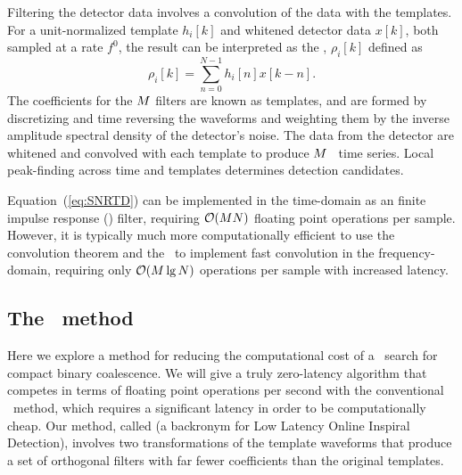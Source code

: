 Filtering the detector data involves a convolution of the data with the
templates.  For a unit-normalized template $h_i[k]$ and whitened detector data
$x[k]$, both sampled at a rate $f^0$, the result can be interpreted as the
\SNR{}, $\rho_i[k]$ defined as
%
%
\begin{equation}
	\label{eq:SNRTD}
	\rho_i [k] = \sum_{n=0}^{N-1} h_{i}[n] x [k-n].
\end{equation}
The coefficients for the $M$ filters are known as templates, 
and are formed by discretizing and time reversing the
waveforms and weighting them by the inverse amplitude spectral density of the
detector's noise. The data from the detector are whitened and convolved with each
template to produce $M$ \SNR\ time series. Local peak-finding across time and
templates determines detection candidates.

Equation~(\ref{eq:SNRTD}) can be implemented in the time-domain as an
finite impulse response (\fir) filter, requiring $\mathcal O(M
N)$ floating point operations per sample.  However, it is typically
much more computationally efficient to use the convolution theorem and the
\fft\ to implement fast convolution in the frequency-domain, requiring only
$\mathcal O(M \lg N)$ operations per sample with increased
latency.


\subsection{The \lloid\ method}

Here we explore a method for reducing the computational cost of a \TD\ search
for compact binary coalescence.  We will give a truly zero-latency algorithm
that competes in terms of floating point operations per second with the
conventional \FD\ method, which requires a significant latency in order to be
computationally cheap. Our method, called \lloid{} (a backronym for
Low Latency Online Inspiral Detection),
involves two transformations of the template waveforms that produce a set of
orthogonal filters with far fewer coefficients than the original templates.

